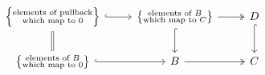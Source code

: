 \documentclass[main.tex]{subfiles}
\begin{document}
\begin{equation*}
  \begin{tikzcd}
    \left\{ \substack{\text{elements of pullback}\\\text{which map to $0$}} \right\}
    \arrow[r, hookrightarrow]
    \arrow[d, equals]
    & \left\{ \substack{\text{elements of $B$}\\\text{which map to $C$}} \right\}
    \arrow[r, twoheadrightarrow]
    \arrow[d, hookrightarrow]
    & D
    \arrow[d, hookrightarrow]
    \\
    \left\{ \substack{\text{elements of $B$}\\\text{which map to $0$}} \right\}
    \arrow[r, hookrightarrow]
    & B
    \arrow[r, twoheadrightarrow]
    & C
  \end{tikzcd}
\end{equation*}
\end{document}
